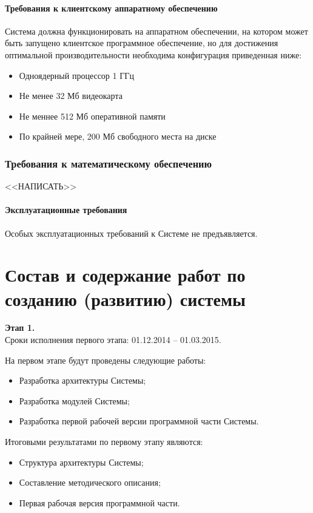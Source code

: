\subsubsection{Требования к клиентскому аппаратному обеспечению}
Система должна функционировать на аппаратном обеспечении, на котором может быть запущено 
клиентское программное обеспечение, но для достижения оптимальной производительности 
необходима конфигурация приведенная ниже:
\begin{itemize}
    \item Одноядерный процессор 1 ГГц
    \item Не менее 32 Мб видеокарта
    \item Не меннее 512 Мб оперативной памяти
    \item По крайней мере, 200 Мб свободного места на диске
\end{itemize}

\subsection{Требования к математическому обеспечению}
<<НАПИСАТЬ>>

\subsubsection{Эксплуатационные требования}
Особых эксплуатационных требований к Системе не предъявляется.

\chapter{Состав и содержание работ по созданию (развитию) системы}
\textbf{Этап 1.}\\
Сроки исполнения первого этапа: 01.12.2014 -- 01.03.2015.

На первом этапе будут проведены следующие работы:
\begin{itemize}
    \item Разработка архитектуры Системы;
    \item Разработка модулей Системы;
    \item Разработка первой рабочей версии программной части Системы.
\end{itemize}
Итоговыми результатами по первому этапу являются:
\begin{itemize}
    \item Структура архитектуры Системы;
    \item Составление методического описания;
    \item Первая рабочая версия программной части.
\end{itemize}

